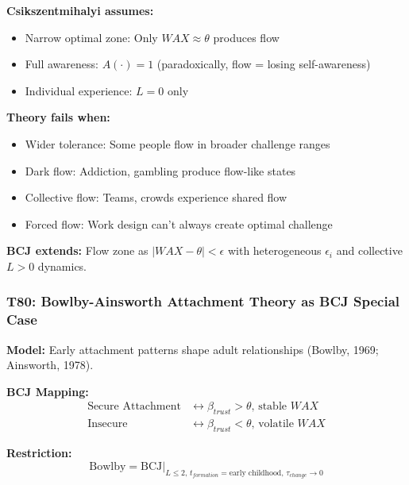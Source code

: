 \begin{tcolorbox}[colback=red!5!white, colframe=red!75!black,
    title=Boundary Condition: Where Csikszentmihalyi Fails]
\textbf{Csikszentmihalyi assumes:}
\begin{itemize}[nosep]
\item Narrow optimal zone: Only $WAX \approx \theta$ produces flow
\item Full awareness: $A(\cdot) = 1$ (paradoxically, flow = losing self-awareness)
\item Individual experience: $L = 0$ only
\end{itemize}

\textbf{Theory fails when:}
\begin{itemize}[nosep]
\item Wider tolerance: Some people flow in broader challenge ranges
\item Dark flow: Addiction, gambling produce flow-like states
\item Collective flow: Teams, crowds experience shared flow
\item Forced flow: Work design can't always create optimal challenge
\end{itemize}

\textbf{BCJ extends:} Flow zone as $|WAX - \theta| < \epsilon$ with heterogeneous $\epsilon_i$ and collective $L > 0$ dynamics.
\end{tcolorbox}

\subsubsection*{T80: Bowlby-Ainsworth Attachment Theory as BCJ Special Case}

\textbf{Model:} Early attachment patterns shape adult relationships (Bowlby, 1969; Ainsworth, 1978).

\textbf{BCJ Mapping:}
\begin{align}
\text{Secure Attachment} &\leftrightarrow \beta_{trust} > \theta, \, \text{stable } WAX \\
\text{Insecure} &\leftrightarrow \beta_{trust} < \theta, \, \text{volatile } WAX
\end{align}

\textbf{Restriction:}
\begin{equation}
\text{Bowlby} = \text{BCJ} \big|_{L \leq 2, \, t_{formation} = \text{early childhood}, \, \tau_{change} \to 0}
\end{equation}

